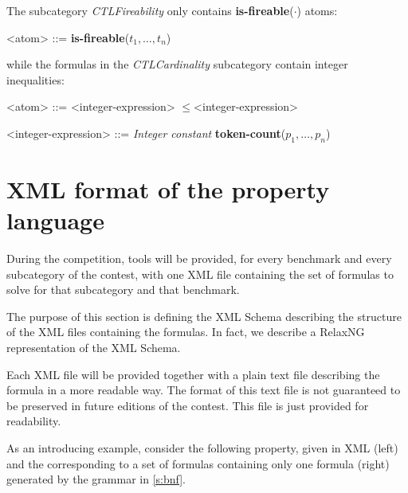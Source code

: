 \documentclass[10pt,english,a4paper]{article}
\newcommand\ctla             {\textbf{A}\xspace}
\newcommand\ctle             {\textbf{E}\xspace}
\newcommand\atomleq          {\boldmath$\leq$\xspace}
\newcommand\atomisfire[1]    {\textbf{is-fireable}(#1)}
\newcommand\atomtokenscnt[1] {\textbf{token-count}(#1)}
\begin{document}
The subcategory \emph{CTLFireability} only contains \atomisfire{$\cdot$}
atoms:

\begin{grammar}
<atom> ::= \atomisfire{$t_1, \ldots, t_n$}
\end{grammar}

while the formulas in the \emph{CTLCardinality} subcategory contain
integer inequalities:

\begin{grammar}
<atom> ::= <integer-expression> \atomleq <integer-expression>

<integer-expression> ::= \textit{Integer constant}
\alt \atomtokenscnt{$p_1, \ldots, p_n$}
\end{grammar}



\section{XML format of the property language}
\label{s:rng}

During the competition, tools will be provided, for every benchmark and
every subcategory of the contest, with one XML file containing the set of
formulas to solve for that subcategory and that benchmark.

The purpose of this section is defining the XML Schema describing the
structure of the XML files containing the formulas.
In fact, we describe a RelaxNG representation of the XML Schema.

Each XML file will be provided together with a plain text file describing
the formula in a more readable way.
The format of this text file is not guaranteed to be preserved in future
editions of the contest. This file is just provided for readability.

As an introducing example, consider the following property, given in XML
(left) and the corresponding to a set of formulas containing only one
formula (right) generated by the grammar in \cref{s:bnf}.
\end{document}

